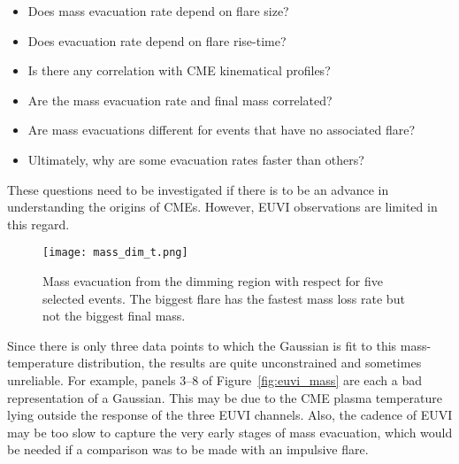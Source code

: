 \begin{itemize}
\item Does mass evacuation rate depend on flare size?
\item Does evacuation rate depend on flare rise-time?
\item Is there any correlation with CME kinematical profiles?
\item Are the mass evacuation rate and final mass correlated?
\item Are mass evacuations different for events that have no associated flare?
\item Ultimately, why are some evacuation rates faster than others?
\end{itemize}
These questions need to be investigated if there is to be an advance in understanding the origins of CMEs. However, EUVI observations are limited in this regard.
\begin{figure}[t!]
\begin{center}
\texttt{[image: mass\_dim\_t.png]}
\caption[Mass evacuation with time]{Mass evacuation from the dimming region with respect for five selected events. The biggest flare has the fastest mass loss rate but not the biggest final mass. \citep{aschw09}}
\label{fig:mass_dim_time}
\end{center}
\end{figure}
Since there is only three data points to which the Gaussian is fit to this mass-temperature distribution, the results are quite unconstrained and sometimes unreliable. For example, panels 3--8 of Figure~\ref{fig:euvi_mass} are each a bad representation of a Gaussian. This may be due to the CME plasma temperature lying outside the response of the three EUVI channels. Also, the cadence of EUVI may be too slow to capture the very early stages of mass evacuation, which would be needed if a comparison was to be made with an impulsive flare.

